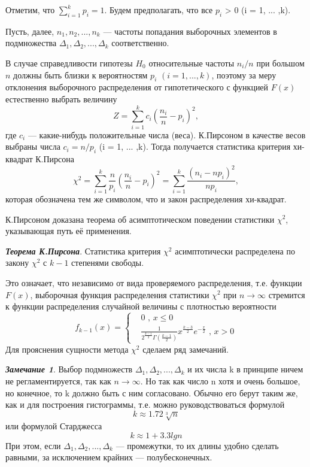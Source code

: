 Отметим, что $\sum_{i=1}^{k}{p_{i}} = 1$.
Будем предполагать, что все $p_{i}$ > 0 (i = 1, ... ,k).

Пусть, далее, $n_{1},n_{2}, ... ,n_{k}$ — частоты попадания выборочных элементов в подмножества $\Delta_{1},\Delta_{2}, ... ,\Delta_{k}$ соответственно.

В случае справедливости гипотезы $H_{0}$ относительные частоты $n_{i}/n$ при большом $n$ должны быть близки к вероятностям $p_{i}$ $(i = 1, ... ,k)$, поэтому за меру отклонения выборочного распределения от гипотетического с функцией $F(x)$ естественно выбрать величину
\begin{equation}
	Z = \sum_{i = 1}^{k}{c_{i}(\frac{n_{i}}{n} - p_{i})^{2}}, 
	\label{Z}
\end{equation}
где $c_{i}$ — какие-нибудь положительные числа (веса). К.Пирсоном в качестве весов выбраны числа $c_{i} = n/p_{i}$ (i = 1, ... ,k). Тогда получается статистика критерия хи-квадрат К.Пирсона
\begin{equation}
	\chi^{2} = \sum_{i = 1}^{k}{\frac{n}{p_{i}}(\frac{n_{i}}{n} - p_{i})^{2}} = \sum_{i = 1}^{k}{\frac{(n_{i} - np_{i})^{2}}{np_{i}}}, 
	\label{chi_2}
\end{equation}
которая обозначена тем же символом, что и закон распределения хи-квадрат.

К.Пирсоном доказана теорема об асимптотическом поведении статистики $\chi^{2}$, указывающая путь её применения.

\textbf{\textit{Теорема К.Пирсона}}. Статистика критерия $\chi^{2}$ асимптотически распределена по закону $\chi^{2}$ с $k-1$ степенями свободы.

Это означает, что независимо от вида проверяемого распределения, т.е. функции $F(x)$, выборочная функция распределения статистики $\chi^{2}$ при $n \rightarrow \infty$  стремится к функции распределения случайной величины с плотностью вероятности 
\begin{equation}
	f_{k - 1}(x) = 
	\begin{cases}
		& 0 \text{ , } x  \leq 0  \\ 
		& \frac{1}{2^{\frac{k-1}{2}}\Gamma(\frac{k-1}{2})}x^{\frac{k-3}{2}}e^{-\frac{x}{2}}
		\text{ , } x>0 
	\end{cases}
	\label{f_k-1}
\end{equation}
Для прояснения сущности метода $\chi^{2}$ сделаем ряд замечаний.

\textbf{\textit{Замечание 1}}. Выбор подмножеств $\Delta_{1},\Delta_{2}, ... ,\Delta_{k}$ и их числа k в принципе ничем не регламентируется, так как $n \rightarrow \infty$. Но так как число n хотя и очень большое, но конечное, то k должно быть с ним согласовано. Обычно его берут таким же, как и для построения гистограммы, т.е. можно руководствоваться формулой
\begin{equation}
	k \approx 1.72\sqrt[3]{n}
	\label{k_1}
\end{equation}
или формулой Старджесса
\begin{equation}
	k \approx 1 + 3.3lgn
\end{equation}
При этом, если  $\Delta_{1},\Delta_{2}, ... ,\Delta_{k}$ — промежутки, то их длины удобно сделать равными, за исключением крайних — полубесконечных.

